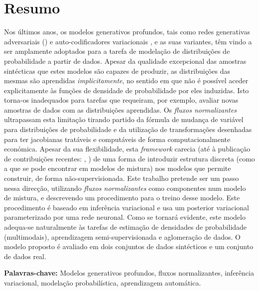 \section*{Resumo}


Nos últimos anos, os modelos generativos profundos, tais como redes generativas
adversariais (\autocite{GAN}) e auto-codificadores variacionais \autocite{vaepaper},
e as suas variantes, têm vindo a ser amplamente adoptados para a tarefa de modelação
de distribuições de probabilidade a partir de dados. Apesar da qualidade excepcional das amostras sintécticas
que estes modelos são capazes de produzir, as distribuições das mesmas são aprendidas
\emph{implicitamente}, no sentido em que não é possível aceder explicitamente às funções de densidade
de probabilidade por eles induzidas. Isto torna-os inadequados para tarefas que
requeiram, por exemplo, avaliar novas amostras de dados com as distribuições
aprendidas. Os \emph{fluxos normalizantes} ultrapassam esta limitação tirando partido da
fórmula de mudança de variável para distribuições de probabilidade e da utilização
de transformações desenhadas para ter jacobianas tratáveis e computáveis de forma
computacionalmente económica. Apesar da sua flexibilidade, esta \emph{framework} carecia (até à publicação
de contribuições recentes: \autocite{semisuplearning_nflows}, \autocite{RAD}) de uma forma
de introduzir estrutura discreta (como a que se pode encontrar em modelos de mistura)
nos modelos que permite construir, de forma não-supervisionada. Este trabalho
pretende ser um passo nessa direcção, utilizando \emph{fluxos normalizantes} como
componentes num modelo de mistura, e descrevendo um procedimento para o treino
desse modelo. Este procedimento é baseado em inferência variacional e usa um posterior
variacional parameterizado por uma rede neuronal. Como se tornará evidente, este
modelo adequa-se naturalmente às tarefas de estimação de densidades de probabilidade (multimodais),
aprendizagem semi-supervisionada e aglomeração de dados. O modelo proposto é
avaliado em dois conjuntos de dados sintécticos e um conjunto de dados real.
\vfill

\textbf{\Large Palavras-chave:} Modelos generativos profundos, fluxos normalizantes,
inferência variacional, modelação probabilística, aprendizagem automática.
